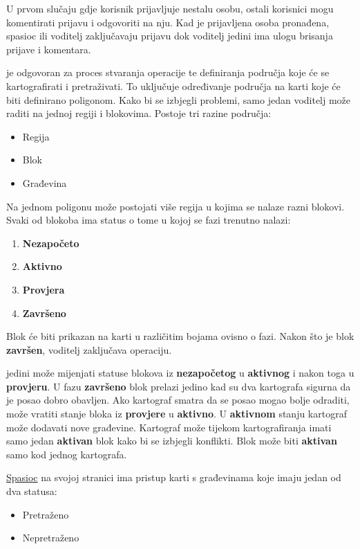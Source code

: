 \documentclass{article}
\begin{document}
			U prvom slučaju gdje korisnik prijavljuje nestalu osobu, ostali korisnici mogu komentirati prijavu i odgovoriti na nju. Kad je prijavljena osoba pronađena, spasioc ili voditelj zaključavaju prijavu dok voditelj jedini ima ulogu brisanja prijave i komentara.
			
			 je odgovoran za proces stvaranja operacije te definiranja područja koje će se kartografirati i pretraživati. To uključuje određivanje područja na karti koje će biti definirano poligonom. Kako bi se izbjegli problemi, samo jedan voditelj može raditi na jednoj regiji i blokovima.
			Postoje tri razine područja:
			\begin{itemize}
				\item Regija
				\item Blok
				\item Građevina
			\end{itemize}
			
			Na jednom poligonu može postojati više regija u kojima se nalaze razni blokovi. Svaki od blokoba ima status o tome u kojoj se fazi trenutno nalazi:
			\begin{enumerate}
				\item \textbf{Nezapočeto}
				\item \textbf{Aktivno}
				\item \textbf{Provjera}
				\item \textbf{Završeno}
			\end{enumerate}
			
			Blok će biti prikazan na karti u različitim bojama ovisno o fazi. Nakon što je blok \textbf{završen}, voditelj zaključava operaciju.
			
			 jedini može mijenjati statuse blokova iz \textbf{nezapočetog} u \textbf{aktivnog} i nakon toga u \textbf{provjeru}. U fazu \textbf{završeno} blok prelazi jedino kad su dva kartografa sigurna da je posao dobro obavljen. Ako kartograf smatra da se posao mogao bolje odraditi, može vratiti stanje bloka iz \textbf{provjere} u \textbf{aktivno}. U \textbf{aktivnom} stanju kartograf može dodavati nove građevine. Kartograf može tijekom kartografiranja imati samo jedan \textbf{aktivan} blok kako bi se izbjegli konflikti. Blok može biti \textbf{aktivan} samo kod jednog kartografa.
			
			\underline{Spasioc} na svojoj stranici ima pristup karti s građevinama koje imaju jedan od dva statusa:
			\begin{itemize}
				\item Pretraženo
				\item Nepretraženo
			\end{itemize}
			
\end{document}

